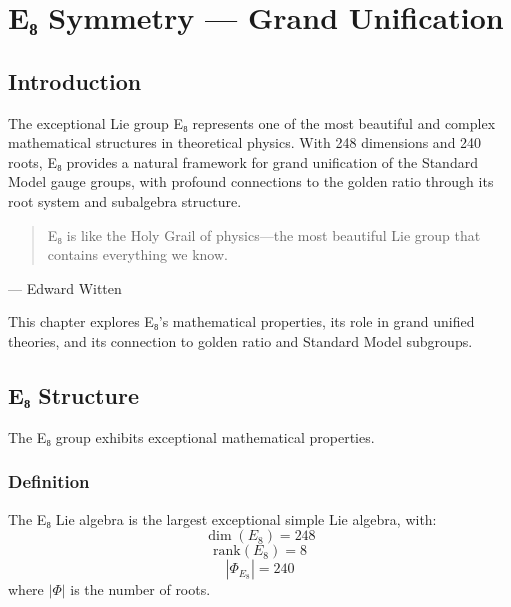 \chapter{E₈ Symmetry — Grand Unification}
\label{ch:22}

\section{Introduction}

The exceptional Lie group E₈ represents one of the most beautiful and complex mathematical structures in theoretical physics. With 248 dimensions and 240 roots, E₈ provides a natural framework for grand unification of the Standard Model gauge groups, with profound connections to the golden ratio through its root system and subalgebra structure.

\begin{quote}
E₈ is like the Holy Grail of physics—the most beautiful Lie group that contains everything we know.
\end{quote}
— Edward Witten

This chapter explores E₈'s mathematical properties, its role in grand unified theories, and its connection to golden ratio and Standard Model subgroups.

\section{E₈ Structure}

The E₈ group exhibits exceptional mathematical properties.

\subsection{Definition}

\begin{definition}
\label{def:e8}
The E₈ Lie algebra is the largest exceptional simple Lie algebra, with:
\begin{equation}
\dim(E_8) = 248
\end{equation}
\begin{equation}
\text{rank}(E_8) = 8
\end{equation}
\begin{equation}
|\Phi_{E_8}| = 240
\end{equation}
where $|\Phi|$ is the number of roots.
\end{definition}

